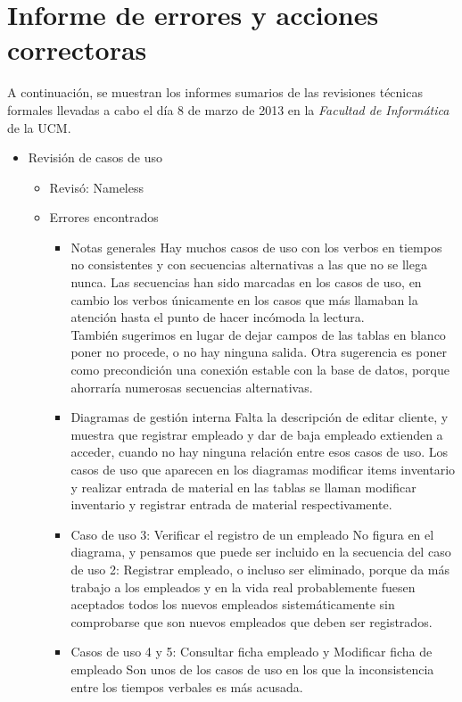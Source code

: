 \documentclass[11pt, a4paper, twoside, titlepage]{article}
\begin{document}
	\section{Informe de errores y acciones correctoras}%
		A continuación, se muestran los informes sumarios de las revisiones técnicas formales llevadas a cabo el día 8 de marzo de 2013 en la \textit{Facultad de Informática} de la UCM.
		\begin{itemize}
			\item Revisión de casos de uso
				\begin{itemize}
					\item Revisó: Nameless
					\item Errores encontrados
						\begin{itemize}
							\item Notas generales 
								Hay muchos casos de uso con los verbos en tiempos no consistentes y con secuencias alternativas a las que no se llega nunca. Las secuencias han sido marcadas en los casos de uso, en cambio los verbos únicamente en los casos que más llamaban la atención hasta el punto de hacer incómoda la lectura. \\
								También sugerimos en lugar de dejar campos de las tablas en blanco poner no procede, o no hay ninguna salida. Otra sugerencia es poner como precondición una conexión estable con la base de datos, porque ahorraría numerosas secuencias alternativas.
							\item Diagramas de gestión interna 
								Falta la descripción de editar cliente, y muestra que registrar empleado y dar de baja empleado extienden a acceder, cuando no hay ninguna relación entre esos casos de uso. Los casos de uso que aparecen en los diagramas modificar items inventario y realizar entrada de material en las tablas se llaman modificar inventario y registrar entrada de material respectivamente.
							\item Caso de uso 3: Verificar el registro de un empleado 
								No figura en el diagrama, y pensamos que puede ser incluido en la secuencia del caso de uso 2: Registrar empleado, o incluso ser eliminado, porque da más trabajo a los empleados y en la vida real probablemente fuesen aceptados todos los nuevos empleados sistemáticamente sin comprobarse que son nuevos empleados que deben ser registrados.
							\item Casos de uso 4 y 5: Consultar ficha empleado y Modificar ficha de empleado 
								Son unos de los casos de uso en los que la inconsistencia entre los tiempos verbales es más acusada.

\end{itemize}
\end{itemize}
\end{itemize}
\end{document}
